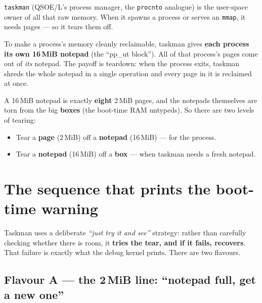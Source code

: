 \texttt{taskman} (QSOE/L's process manager, the \texttt{procnto}
analogue) is the user-space owner of all that raw memory. When it
spawns a process or serves an \texttt{mmap}, it needs pages --- so it
tears them off.

To make a process's memory cleanly reclaimable, taskman gives
\textbf{each process its own 16\,MiB notepad} (the ``pp\_ut block'').
All of that process's pages come out of \emph{its} notepad. The payoff
is teardown: when the process exits, taskman shreds the whole notepad
in a single operation and every page in it is reclaimed at once.

A 16\,MiB notepad is exactly \textbf{eight} 2\,MiB pages, and the
notepads themselves are torn from the big \textbf{boxes} (the boot-time
RAM untypeds). So there are two levels of tearing:

\begin{itemize}
    \item Tear a \textbf{page} (2\,MiB) off a \textbf{notepad}
          (16\,MiB) --- for the process.
    \item Tear a \textbf{notepad} (16\,MiB) off a \textbf{box} ---
          when taskman needs a fresh notepad.
\end{itemize}

\section{The sequence that prints the boot-time warning}

Taskman uses a deliberate \emph{``just try it and see''} strategy:
rather than carefully checking whether there is room, it \textbf{tries
the tear, and if it fails, recovers}. That failure is exactly what the
debug kernel prints. There are two flavours.

\subsection{Flavour A --- the 2\,MiB line: ``notepad full, get a new one''}


